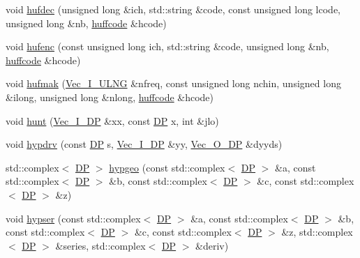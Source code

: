 \begin{DoxyCompactItemize}
\item 
void \mbox{\hyperlink{namespaceNR_a2b3c3380b58a2d4cbf0c61f8bd444aec}{hufdec}} (unsigned long \&ich, std\+::string \&code, const unsigned long lcode, unsigned long \&nb, \mbox{\hyperlink{classNR_1_1huffcode}{huffcode}} \&hcode)
\item 
void \mbox{\hyperlink{namespaceNR_af74ccd5e55d8850e189e33cc374a6c5b}{hufenc}} (const unsigned long ich, std\+::string \&code, unsigned long \&nb, \mbox{\hyperlink{classNR_1_1huffcode}{huffcode}} \&hcode)
\item 
void \mbox{\hyperlink{namespaceNR_ae3369986daacfe65a679f2334cb53267}{hufmak}} (\mbox{\hyperlink{namespaceNR_a117570729decc729db86f7655e7a23e5}{Vec\+\_\+\+I\+\_\+\+U\+L\+NG}} \&nfreq, const unsigned long nchin, unsigned long \&ilong, unsigned long \&nlong, \mbox{\hyperlink{classNR_1_1huffcode}{huffcode}} \&hcode)
\item 
void \mbox{\hyperlink{namespaceNR_a6bbdb382ae25b5c8c0baba1d48d848e1}{hunt}} (\mbox{\hyperlink{namespaceNR_a9f943da53862537c552e2a770cb170ae}{Vec\+\_\+\+I\+\_\+\+DP}} \&xx, const \mbox{\hyperlink{namespaceNR_af6ff762dd605ff477b8e52387253a02a}{DP}} x, int \&jlo)
\item 
void \mbox{\hyperlink{namespaceNR_a329631db0425541c0568938c22633e99}{hypdrv}} (const \mbox{\hyperlink{namespaceNR_af6ff762dd605ff477b8e52387253a02a}{DP}} s, \mbox{\hyperlink{namespaceNR_a9f943da53862537c552e2a770cb170ae}{Vec\+\_\+\+I\+\_\+\+DP}} \&yy, \mbox{\hyperlink{namespaceNR_a970094d23441f8ef6a45282a7eb2103d}{Vec\+\_\+\+O\+\_\+\+DP}} \&dyyds)
\item 
std\+::complex$<$ \mbox{\hyperlink{namespaceNR_af6ff762dd605ff477b8e52387253a02a}{DP}} $>$ \mbox{\hyperlink{namespaceNR_a8666a2088d3699fe0bc7f14f0b51b5ed}{hypgeo}} (const std\+::complex$<$ \mbox{\hyperlink{namespaceNR_af6ff762dd605ff477b8e52387253a02a}{DP}} $>$ \&a, const std\+::complex$<$ \mbox{\hyperlink{namespaceNR_af6ff762dd605ff477b8e52387253a02a}{DP}} $>$ \&b, const std\+::complex$<$ \mbox{\hyperlink{namespaceNR_af6ff762dd605ff477b8e52387253a02a}{DP}} $>$ \&c, const std\+::complex$<$ \mbox{\hyperlink{namespaceNR_af6ff762dd605ff477b8e52387253a02a}{DP}} $>$ \&z)
\item 
void \mbox{\hyperlink{namespaceNR_a5464226b1eb7a8ab468acb9d8194a5cb}{hypser}} (const std\+::complex$<$ \mbox{\hyperlink{namespaceNR_af6ff762dd605ff477b8e52387253a02a}{DP}} $>$ \&a, const std\+::complex$<$ \mbox{\hyperlink{namespaceNR_af6ff762dd605ff477b8e52387253a02a}{DP}} $>$ \&b, const std\+::complex$<$ \mbox{\hyperlink{namespaceNR_af6ff762dd605ff477b8e52387253a02a}{DP}} $>$ \&c, const std\+::complex$<$ \mbox{\hyperlink{namespaceNR_af6ff762dd605ff477b8e52387253a02a}{DP}} $>$ \&z, std\+::complex$<$ \mbox{\hyperlink{namespaceNR_af6ff762dd605ff477b8e52387253a02a}{DP}} $>$ \&series, std\+::complex$<$ \mbox{\hyperlink{namespaceNR_af6ff762dd605ff477b8e52387253a02a}{DP}} $>$ \&deriv)

\end{DoxyCompactItemize}
